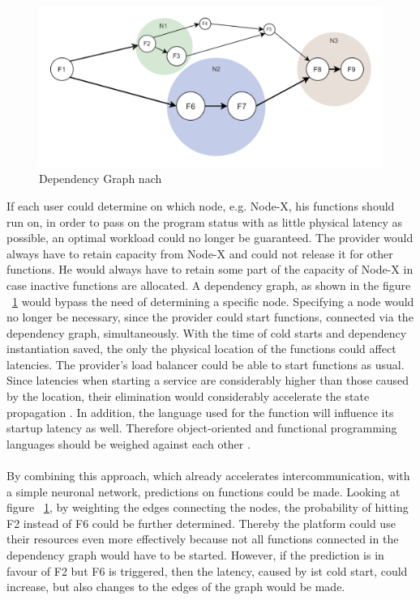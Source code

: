 \documentclass[11pt]{article}
\begin{document}
\begin{figure}[H]
\caption{Dependency Graph nach \cite{shafiei2020serverless}}
\label{fig:dependencyGraph}
\centering
\includegraphics[width=1\textwidth]{DependencyGraph}
\end{figure}
If each user could determine on which node, e.g. Node-X, his functions should run on, in order to pass on the program status with as little physical latency as possible, an optimal workload could no longer be guaranteed. The provider would always have to retain capacity from Node-X and could not release it for other functions. He would always have to retain some part of the capacity of Node-X in case inactive functions are allocated. A dependency graph, as shown in the figure ~\ref{fig:dependencyGraph} would bypass the need of determining a specific node. Specifying a node would no longer be necessary, since the provider could start functions, connected via the dependency graph, simultaneously. With the time of cold starts and dependency instantiation saved, the only the physical location of the functions could affect latencies. The provider's load balancer could be able to start functions as usual. Since latencies when starting a service are considerably higher than those caused by the location, their elimination would considerably accelerate the state propagation \cite{aditya2019will} \cite{jackson2018investigation}. In addition, the language used for the function will influence its startup latency as well. Therefore object-oriented and functional programming languages should be weighed against each other \cite{manner2018cold}. \\\\
By combining this approach, which already accelerates intercommunication, with a simple neuronal network, predictions on functions could be made. Looking at figure ~\ref{fig:dependencyGraph}, by weighting the edges connecting the nodes, the probability of hitting F2 instead of F6 could be further determined. Thereby the platform could use their resources even more effectively because not all functions connected in the dependency graph would have to be started. However, if the prediction is in favour of F2 but F6 is triggered, then the latency, caused by ist cold start, could increase, but also changes to the edges of the graph would be made.\\\\
\end{document}
